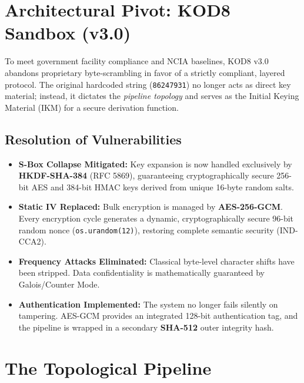 \documentclass[11pt]{article}
\begin{document}
\section{Architectural Pivot: KOD8 Sandbox (v3.0)}

To meet government facility compliance and NCIA baselines, KOD8 v3.0 abandons proprietary byte-scrambling in favor of a strictly compliant, layered protocol. The original hardcoded string (\texttt{86247931}) no longer acts as direct key material; instead, it dictates the \emph{pipeline topology} and serves as the Initial Keying Material (IKM) for a secure derivation function.

\subsection{Resolution of Vulnerabilities}
\begin{itemize}[leftmargin=1.6em]
    \item \textbf{S-Box Collapse Mitigated:} Key expansion is now handled exclusively by \textbf{HKDF-SHA-384} (RFC 5869), guaranteeing cryptographically secure 256-bit AES and 384-bit HMAC keys derived from unique 16-byte random salts.
    \item \textbf{Static IV Replaced:} Bulk encryption is managed by \textbf{AES-256-GCM}. Every encryption cycle generates a dynamic, cryptographically secure 96-bit random nonce (\texttt{os.urandom(12)}), restoring complete semantic security (IND-CCA2).
    \item \textbf{Frequency Attacks Eliminated:} Classical byte-level character shifts have been stripped. Data confidentiality is mathematically guaranteed by Galois/Counter Mode.
    \item \textbf{Authentication Implemented:} The system no longer fails silently on tampering. AES-GCM provides an integrated 128-bit authentication tag, and the pipeline is wrapped in a secondary \textbf{SHA-512} outer integrity hash.
\end{itemize}

\section{The Topological Pipeline}
\end{document}
